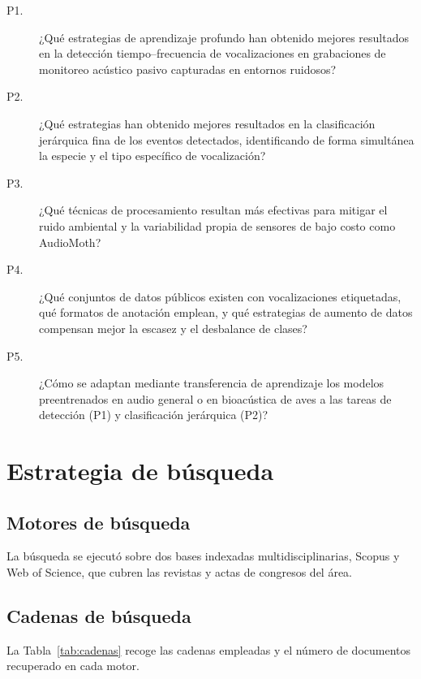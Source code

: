 \begin{description}
    \item[P1.] ¿Qué estrategias de aprendizaje profundo han obtenido mejores
          resultados en la detección tiempo--frecuencia de vocalizaciones en
          grabaciones de monitoreo acústico pasivo capturadas en entornos ruidosos?

    \item[P2.] ¿Qué estrategias han obtenido mejores resultados en la
          clasificación jerárquica fina de los eventos detectados, identificando de
          forma simultánea la especie y el tipo específico de vocalización?

    \item[P3.] ¿Qué técnicas de procesamiento resultan más efectivas para
          mitigar el ruido ambiental y la variabilidad propia de sensores de bajo
          costo como AudioMoth?

    \item[P4.] ¿Qué conjuntos de datos públicos existen con vocalizaciones
          etiquetadas, qué formatos de anotación emplean, y qué estrategias de aumento
          de datos compensan mejor la escasez y el desbalance de clases?

    \item[P5.] ¿Cómo se adaptan mediante transferencia de aprendizaje los
          modelos preentrenados en audio general o en bioacústica de aves a las tareas
          de detección (P1) y clasificación jerárquica (P2)?
\end{description}

\section{Estrategia de búsqueda}

\subsection{Motores de búsqueda}

La búsqueda se ejecutó sobre dos bases indexadas multidisciplinarias, Scopus y
Web of Science, que cubren las revistas y actas de congresos del área.

\subsection{Cadenas de búsqueda}

La Tabla~\ref{tab:cadenas} recoge las cadenas empleadas y el número de documentos
recuperado en cada motor.

